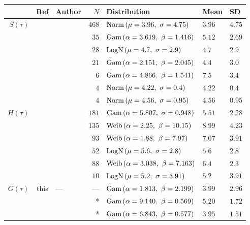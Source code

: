 \small
\begin{tabular}{rclrlll}
	\toprule
	          &         Ref         & Author                    &   $N$ & Distribution                           & Mean   & SD     \\
	\midrule
	$S(\tau)$ &    \cite{Du2020}    & \citeauthor{Du2020}       & $468$ & $\mathop{\mathrm{Norm}}{\left(\mu=3.96,~\sigma=4.75\right)}$     & $3.96$ & $4.75$ \\
	          &  \cite{Zhang2020}   & \citeauthor{Zhang2020}    &  $35$ & $\mathop{\mathrm{Gam}}{\left(\alpha=3.619,~\beta=1.416\right)}$  & $5.12$ & $2.69$ \\
	          & \cite{Nishiura2020} & \citeauthor{Nishiura2020} &  $28$ & $\mathop{\mathrm{LogN}}{\left(\mu=4.7,~\sigma=2.9\right)}$       & $4.7$  & $2.9$  \\
	          &   \cite{Zhao2020}   & \citeauthor{Zhao2020}     &  $21$ & $\mathop{\mathrm{Gam}}{\left(\alpha=2.151,~\beta=2.045\right)}$  & $4.4$  & $3.0$  \\
	          &    \cite{Li2020}    & \citeauthor{Li2020}       &   $6$ & $\mathop{\mathrm{Gam}}{\left(\alpha=4.866,~\beta=1.541\right)}$  & $7.5$  & $3.4$  \\
	          & \cite{Tindale2020}  & \citeauthor{Tindale2020}  &   $4$ & $\mathop{\mathrm{Norm}}{\left(\mu=4.22,~\sigma=0.4\right)}$      & $4.22$ & $0.4$  \\
	          & \cite{Tindale2020}  & \citeauthor{Tindale2020}  &   $4$ & $\mathop{\mathrm{Norm}}{\left(\mu=4.56,~\sigma=0.95\right)}$     & $4.56$ & $0.95$ \\
	\midrule
	$H(\tau)$ &  \cite{Lauer2020}   & \citeauthor{Lauer2020}    & $181$ & $\mathop{\mathrm{Gam}}{\left(\alpha=5.807,~\sigma=0.948\right)}$ & $5.51$ & $2.28$ \\
	          & \cite{Tindale2020}  & \citeauthor{Tindale2020}  & $135$ & $\mathop{\mathrm{Weib}}{\left(\alpha=2.25,~\beta=10.15\right)}$  & $8.99$ & $4.23$ \\
	          & \cite{Tindale2020}  & \citeauthor{Tindale2020}  &  $93$ & $\mathop{\mathrm{Weib}}{\left(\alpha=1.88,~\beta=7.97\right)}$   & $7.07$ & $3.91$ \\
	          &  \cite{Linton2020}  & \citeauthor{Linton2020}   &  $52$ & $\mathop{\mathrm{LogN}}{\left(\mu=5.6,~\sigma=2.8\right)}$       & $5.6$  & $2.8$  \\
	          &  \cite{Backer2020}  & \citeauthor{Backer2020}   &  $88$ & $\mathop{\mathrm{Weib}}{\left(\alpha=3.038,~\beta=7.163\right)}$ & $6.4$  & $2.3$  \\
	          &    \cite{Li2020}    & \citeauthor{Li2020}       &  $10$ & $\mathop{\mathrm{LogN}}{\left(\mu=5.2,~\sigma=3.91\right)}$      & $5.2$  & $3.91$ \\
	\midrule
	$G(\tau)$ &        this         & ---                       &   --- & $\mathop{\mathrm{Gam}}{\left(\alpha=1.813,~\beta=2.199\right)}$  & $3.99$ & $2.96$ \\
	          & \cite{Ganyani2020}  & \citeauthor{Ganyani2020}  &     * & $\mathop{\mathrm{Gam}}{\left(\alpha=9.140,~\beta=0.569\right)}$  & $5.20$ & $1.72$ \\
	          & \cite{Ganyani2020}  & \citeauthor{Ganyani2020}  &     * & $\mathop{\mathrm{Gam}}{\left(\alpha=6.843,~\beta=0.577\right)}$  & $3.95$ & $1.51$ \\
	\bottomrule
\end{tabular}
